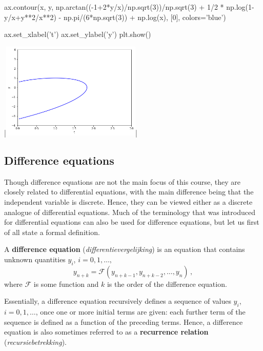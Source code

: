 \begin{example}
\begin{pyin}
ax.contour(x, y, np.arctan((-1+2*y/x)/np.sqrt(3))/np.sqrt(3) + 1/2 * np.log(1-y/x+y**2/x**2) - np.pi/(6*np.sqrt(3)) + np.log(x), [0], colors='blue')

ax.set_xlabel('t')
ax.set_ylabel('y')
plt.show()
\end{pyin}
\begin{pyout}
|\includegraphics[width=0.5\textwidth]{figures/IntroDE/Impliciet_Vb_Python.png}|
\end{pyout}
\fi
\end{example}


\subsection{Difference equations}
\label{differenceEquations}
Though difference equations are not the main focus of this course, they are closely related to differential equations, with the main difference being that the independent variable is discrete. Hence, they can be viewed either as a discrete analogue of differential equations. Much of the terminology that was introduced for differential equations can also be used for difference equations, but let us first of all state a formal definition.

\begin{definition} 
A  \textbf{difference equation} (\textit{differentievergelijking}) is an equation that contains unknown quantities $y_i$, $i=0,1,\ldots,$
\begin{equation}
y_{n+k}=\mathcal{F}\left(y_{n+k-1},y_{n+k-2},\ldots,y_{n}\right)\,,
\label{DV_Dif_1}
\end{equation}
where $\mathcal{F}$ is some function and $k$ is the order of the difference equation. 
\end{definition}
Essentially, a difference equation recursively defines a sequence of values $y_i$, $i=0,1,\ldots$, once one or more initial terms are given: each further term of the sequence is defined as a function of the preceding terms. Hence, a difference equation is also sometimes referred to as a \textbf{recurrence relation} (\textit{recursiebetrekking}). 



